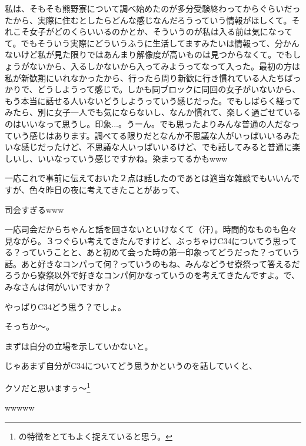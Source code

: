 \begin{multicols}{2}
  
私は、そもそも熊野寮について調べ始めたのが多分受験終わってからぐらいだったから、実際に住むとしたらどんな感じなんだろうっていう情報がほしくて。それこそ女子がどのくらいいるのかとか、そういうのが私は入る前は気になってて。でもそういう実際にどういうふうに生活してますみたいは情報って、分かんないけど私が見た限りではあんまり解像度が高いものは見つからなくて。でもしょうがないから、入るしかないから入ってみようってなって入った。最初の方は私が新歓期にいれなかったから、行ったら周り新歓に行き慣れている人たちばっかりで、どうしようって感じで。しかも同ブロックに同回の女子がいないから、もう本当に話せる人いないどうしようっていう感じだった。でもしばらく経ってみたら、別に女子一人でも気にならないし、なんか慣れて、楽しく過ごせているのはいいなって思うし。印象...。うーん。でも思ったよりみんな普通の人だなっていう感じはあります。調べてる限りだとなんか不思議な人がいっぱいいるみたいな感じだったけど、不思議な人いっぱいいるけど、でも話してみると普通に楽しいし、いいなっていう感じですかね。染まってるかもwww



\vspace{15mm}
\vspace{3mm}

一応これで事前に伝えておいた２点は話したのであとは適当な雑談でもいいんですが、色々昨日の夜に考えてきたことがあって、

  
司会すぎるwww

  
一応司会だからちゃんと話を回さないといけなくて（汗）。時間的なものも色々見ながら。３つぐらい考えてきたんですけど、ぶっちゃけC34についてう思ってる？っていうことと、あと初めて会った時の第一印象ってどうだった？っていう話。あと好きなコンパって何？っていうのもね、みんなどうせ寮祭って答えるだろうから寮祭以外で好きなコンパ何かなっていうのを考えてきたんですよ。で、みなさんは何がいいですか？

  
やっぱりC34どう思う？でしょ。
  
そっちか～。

  
まずは自分の立場を示していかないと。

  
じゃあまず自分がC34についてどう思うかというのを話していくと、

  
クソだと思いますぅ～\footnote{の特徴をとてもよく捉えていると思う。}

  
wwwww


\end{multicols}
